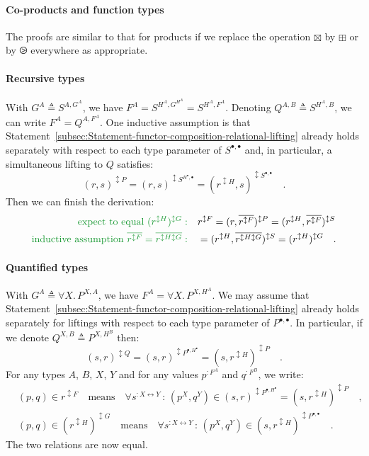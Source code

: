 \paragraph{Co-products and function types}

The proofs are similar to that for products if we replace the operation
$\boxtimes$ by $\boxplus$ or by $\ogreaterthan$ everywhere as appropriate.

\paragraph{Recursive types}

With $G^{A}\triangleq S^{A,G^{A}}$, we have $F^{A}=S^{H^{A},G^{H^{A}}}=S^{H^{A},F^{A}}$.
Denoting $Q^{A,B}\triangleq S^{H^{A},B}$, we can write $F^{A}=Q^{A,F^{A}}$.
One inductive assumption is that Statement~\ref{subsec:Statement-functor-composition-relational-lifting}
already holds separately with respect to each type parameter of $S^{\bullet,\bullet}$
and, in particular, a simultaneous lifting to $Q$ satisfies:
\[
(r,s)^{\updownarrow P}=(r,s)^{\updownarrow S^{H^{\bullet},\bullet}}=(r^{\updownarrow H},s)^{\updownarrow S^{\bullet,\bullet}}\quad.
\]
Then we can finish the derivation:
\begin{align*}
{\color{greenunder}\text{expect to equal }(r^{\updownarrow H})^{\updownarrow G}:}\quad & r^{\updownarrow F}=(r,\overline{r^{\updownarrow F}})^{\updownarrow P}=(r^{\updownarrow H},\overline{r^{\updownarrow F}})^{\updownarrow S}\\
{\color{greenunder}\text{inductive assumption }\overline{r^{\updownarrow F}}=\overline{r^{\updownarrow H\updownarrow G}}:}\quad & =(r^{\updownarrow H},\overline{r^{\updownarrow H\updownarrow G}})^{\updownarrow S}=(r^{\updownarrow H})^{\updownarrow G}\quad.
\end{align*}


\paragraph{Quantified types}

With $G^{A}\triangleq\forall X.\,P^{X,A}$, we have $F^{A}=\forall X.\,P^{X,H^{A}}$.
We may assume that Statement~\ref{subsec:Statement-functor-composition-relational-lifting}
already holds separately for liftings with respect to each type parameter
of $P^{\bullet,\bullet}$. In particular, if we denote $Q^{X,B}\triangleq P^{X,H^{B}}$
then:
\[
(s,r)^{\updownarrow Q}=(s,r)^{\updownarrow P^{\bullet,H^{\bullet}}}=(s,r^{\updownarrow H})^{\updownarrow P}\quad.
\]
For any types $A$, $B$, $X$, $Y$ and for any values $p^{:F^{A}}$
and $q^{:F^{B}}$, we write:
\begin{align*}
 & (p,q)\in r^{\updownarrow F}\quad\text{means}\quad\forall s^{:X\leftrightarrow Y}\,:\,(p^{X},q^{Y})\in(s,r)^{\updownarrow P^{\bullet,H^{\bullet}}}=(s,r^{\updownarrow H})^{\updownarrow P}\quad,\\
 & (p,q)\in(r^{\updownarrow H})^{\updownarrow G}\quad\text{means}\quad\forall s^{:X\leftrightarrow Y}\,:\,(p^{X},q^{Y})\in(s,r^{\updownarrow H})^{\updownarrow P^{\bullet,\bullet}}\quad.
\end{align*}
The two relations are now equal. 

